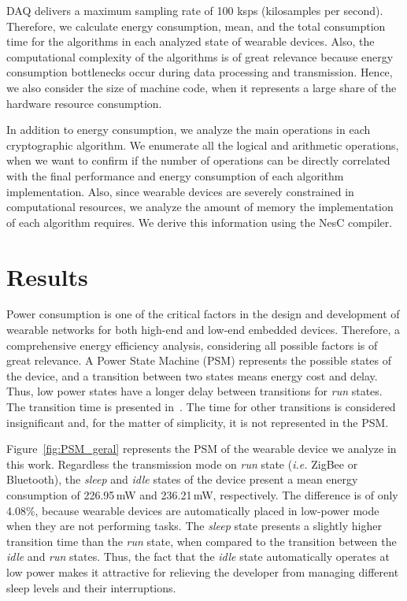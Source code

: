 \documentclass[journal]{IEEEtran}
\begin{document}
DAQ delivers a maximum sampling rate of 100 ksps (kilosamples per second).  Therefore, we calculate energy consumption, mean, and the total consumption time for the algorithms in each analyzed state of wearable devices. Also, the computational complexity of the algorithms is of great relevance because energy consumption bottlenecks occur during data processing and transmission. Hence, we also consider the size of machine code, when it represents a large share of the hardware resource consumption.

In addition to energy consumption, we analyze the main operations in each cryptographic algorithm. We enumerate all the logical and arithmetic operations, when we want to confirm if the number of operations can be directly correlated with the final performance and energy consumption of each algorithm implementation. Also, since wearable devices are severely constrained in computational resources, we analyze the amount of memory the implementation of each algorithm requires. We derive this information using the NesC compiler.


\section{Results}
\label{sec:Results}
%

Power consumption is one of the critical factors in the design and development of wearable networks for both high-end and low-end embedded devices. Therefore, a comprehensive energy efficiency analysis, considering all possible factors is of great relevance. A Power State Machine (PSM) represents the possible states of the device, and a transition between two states means energy cost and delay. %
Thus, low power  states have a  longer delay  between  transitions for {\em run} states. The transition  time is presented in~\cite{goraczko2008energy}. The time for other transitions is considered %
insignificant and, for the matter of simplicity, it is not represented in the PSM.


Figure~\ref{fig:PSM_geral} represents the PSM of the wearable device we analyze in this work. Regardless the transmission mode on {\em run} state ({\em i.e.} ZigBee or Bluetooth), the {\em sleep} and {\em idle} states of the device present a mean energy consumption of 226.95\,mW and 236.21\,mW, respectively. The difference is of only 4.08\%, because wearable devices are automatically placed in low-power mode when they are not performing tasks. The {\em sleep} state presents a slightly higher transition time than the {\em run} state, when compared to the transition between the {\em idle} and {\em run} states. Thus, the fact that the {\em idle} state automatically operates at low power makes it attractive for relieving the developer from managing different sleep levels and their interruptions. 
\end{document}

